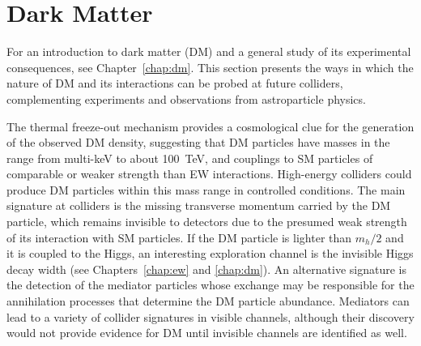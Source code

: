 \documentclass[../report.tex]{subfiles}
\begin{document}
\section{Dark Matter}
\label{sec:BSM-DM}



For an introduction to dark matter (DM) and a general study of its experimental consequences, see Chapter~\ref{chap:dm}. This section presents the ways in which the nature of DM and its interactions can be probed at future colliders, complementing experiments and observations from astroparticle physics. 

The thermal freeze-out mechanism provides a cosmological clue for the generation of the observed DM density, suggesting that DM particles have masses in the range from multi-keV to about 100~TeV, and couplings to SM particles of comparable or weaker strength than EW interactions. High-energy colliders could produce DM particles within this mass range in controlled conditions. The main signature at colliders is the missing transverse momentum carried by the DM particle, which remains invisible to detectors due to the presumed weak strength of its interaction with SM particles. If the DM particle is lighter than $m_h/2$ and it is coupled to the Higgs, an interesting exploration channel is the invisible Higgs decay width (see Chapters~\ref{chap:ew} and \ref{chap:dm}). An alternative signature is the detection of the mediator particles whose exchange may be responsible for the annihilation processes that determine the DM particle abundance. Mediators can lead to a variety of collider signatures in visible channels, although their discovery would not provide evidence for DM until invisible channels are identified as well.
 
\end{document}
